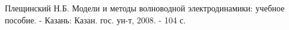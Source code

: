 \begin{thebibliography}{9}
	 Плещинский Н.Б. Модели и методы волноводной электродинамики: учебное пособие. - Казань: Казан. гос. ун-т, 2008. - 104 с. 
\end{thebibliography}